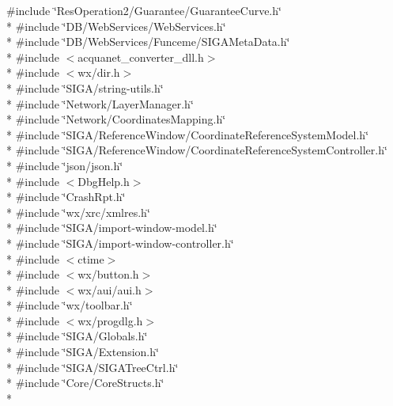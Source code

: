 {\ttfamily \#include \char`\"{}Res\+Operation2/\+Guarantee/\+Guarantee\+Curve.\+h\char`\"{}}\\*
{\ttfamily \#include \char`\"{}D\+B/\+Web\+Services/\+Web\+Services.\+h\char`\"{}}\\*
{\ttfamily \#include \char`\"{}D\+B/\+Web\+Services/\+Funceme/\+S\+I\+G\+A\+Meta\+Data.\+h\char`\"{}}\\*
{\ttfamily \#include $<$acquanet\+\_\+converter\+\_\+dll.\+h$>$}\\*
{\ttfamily \#include $<$wx/dir.\+h$>$}\\*
{\ttfamily \#include \char`\"{}S\+I\+G\+A/string-\/utils.\+h\char`\"{}}\\*
{\ttfamily \#include \char`\"{}Network/\+Layer\+Manager.\+h\char`\"{}}\\*
{\ttfamily \#include \char`\"{}Network/\+Coordinates\+Mapping.\+h\char`\"{}}\\*
{\ttfamily \#include \char`\"{}S\+I\+G\+A/\+Reference\+Window/\+Coordinate\+Reference\+System\+Model.\+h\char`\"{}}\\*
{\ttfamily \#include \char`\"{}S\+I\+G\+A/\+Reference\+Window/\+Coordinate\+Reference\+System\+Controller.\+h\char`\"{}}\\*
{\ttfamily \#include \char`\"{}json/json.\+h\char`\"{}}\\*
{\ttfamily \#include $<$Dbg\+Help.\+h$>$}\\*
{\ttfamily \#include \char`\"{}Crash\+Rpt.\+h\char`\"{}}\\*
{\ttfamily \#include \char`\"{}wx/xrc/xmlres.\+h\char`\"{}}\\*
{\ttfamily \#include \char`\"{}S\+I\+G\+A/import-\/window-\/model.\+h\char`\"{}}\\*
{\ttfamily \#include \char`\"{}S\+I\+G\+A/import-\/window-\/controller.\+h\char`\"{}}\\*
{\ttfamily \#include $<$ctime$>$}\\*
{\ttfamily \#include $<$wx/button.\+h$>$}\\*
{\ttfamily \#include $<$wx/aui/aui.\+h$>$}\\*
{\ttfamily \#include \char`\"{}wx/toolbar.\+h\char`\"{}}\\*
{\ttfamily \#include $<$wx/progdlg.\+h$>$}\\*
{\ttfamily \#include \char`\"{}S\+I\+G\+A/\+Globals.\+h\char`\"{}}\\*
{\ttfamily \#include \char`\"{}S\+I\+G\+A/\+Extension.\+h\char`\"{}}\\*
{\ttfamily \#include \char`\"{}S\+I\+G\+A/\+S\+I\+G\+A\+Tree\+Ctrl.\+h\char`\"{}}\\*
{\ttfamily \#include \char`\"{}Core/\+Core\+Structs.\+h\char`\"{}}\\*
